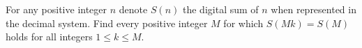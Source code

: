 For any positive integer $n$ denote $S(n)$ the digital sum of $n$ when represented in the decimal system. Find every positive integer $M$ for which $S(Mk)=S(M)$ holds for all integers $1\le k\le M$.